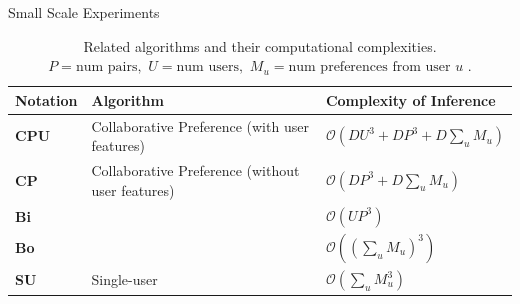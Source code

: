 \documentclass[final]{beamer}
\newlength{\onecolwid}
\begin{document}
\begin{frame}[t]
\begin{columns}[t]
\begin{column}{\onecolwid}
        \begin{block}{Small Scale Experiments}
          \begin{table}[h!]
          \centering
          \caption{Related algorithms and their computational complexities.
          $ P=\text{num pairs},\,\, U = \text{num users},\,\, M_u= \text{num preferences from user }u $ .}
          \begin{tabular}{l|l|l}
            Notation &  Algorithm & Complexity of Inference \\ \hline
            {\bf CPU} & Collaborative Preference (with user features) & $\mathcal{O}(DU^3+DP^3+D\sum_u
            M_u)$  \\
            {\bf CP} & Collaborative Preference (without user features) & $\mathcal{O}(DP^3+D\sum_u
            M_u)$\\
            {\bf Bi} & \cite{birlutiu2009} & $\mathcal{O}(UP^3)$\\
            {\bf Bo} & \cite{bonilla2010} & $\mathcal{O}((\sum_u M_u)^3)$  \\
            {\bf SU} & Single-user \cite{chu2005} & $\mathcal{O}(\sum_u M_u^3)$
          \end{tabular}
          \end{table}

          \vskip-0.5cm
          
        \end{block}


\end{column}
\end{columns}
\end{frame}
\end{document}
